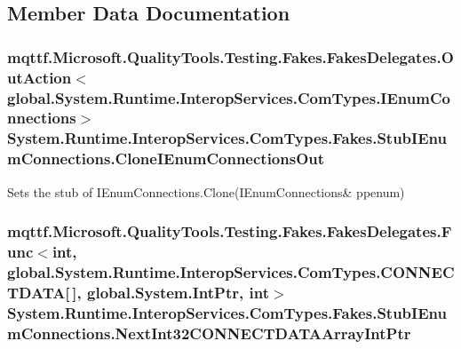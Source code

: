 \subsection{Member Data Documentation}
\hypertarget{class_system_1_1_runtime_1_1_interop_services_1_1_com_types_1_1_fakes_1_1_stub_i_enum_connections_ad90a8adaa982383a5ab4f938f5f9c060}{
\subsubsection[{Clone\-I\-Enum\-Connections\-Out}]{\setlength{\rightskip}{0pt plus 5cm}mqttf.\-Microsoft.\-Quality\-Tools.\-Testing.\-Fakes.\-Fakes\-Delegates.\-Out\-Action$<$global.\-System.\-Runtime.\-Interop\-Services.\-Com\-Types.\-I\-Enum\-Connections$>$ System.\-Runtime.\-Interop\-Services.\-Com\-Types.\-Fakes.\-Stub\-I\-Enum\-Connections.\-Clone\-I\-Enum\-Connections\-Out}}\label{class_system_1_1_runtime_1_1_interop_services_1_1_com_types_1_1_fakes_1_1_stub_i_enum_connections_ad90a8adaa982383a5ab4f938f5f9c060}


Sets the stub of I\-Enum\-Connections.\-Clone(I\-Enum\-Connections\& ppenum)

\hypertarget{class_system_1_1_runtime_1_1_interop_services_1_1_com_types_1_1_fakes_1_1_stub_i_enum_connections_aaf081d9d9a93a282b1f223da3d278876}{
\subsubsection[{Next\-Int32\-C\-O\-N\-N\-E\-C\-T\-D\-A\-T\-A\-Array\-Int\-Ptr}]{\setlength{\rightskip}{0pt plus 5cm}mqttf.\-Microsoft.\-Quality\-Tools.\-Testing.\-Fakes.\-Fakes\-Delegates.\-Func$<$int, global.\-System.\-Runtime.\-Interop\-Services.\-Com\-Types.\-C\-O\-N\-N\-E\-C\-T\-D\-A\-T\-A\mbox{[}$\,$\mbox{]}, global.\-System.\-Int\-Ptr, int$>$ System.\-Runtime.\-Interop\-Services.\-Com\-Types.\-Fakes.\-Stub\-I\-Enum\-Connections.\-Next\-Int32\-C\-O\-N\-N\-E\-C\-T\-D\-A\-T\-A\-Array\-Int\-Ptr}}\label{class_system_1_1_runtime_1_1_interop_services_1_1_com_types_1_1_fakes_1_1_stub_i_enum_connections_aaf081d9d9a93a282b1f223da3d278876}



